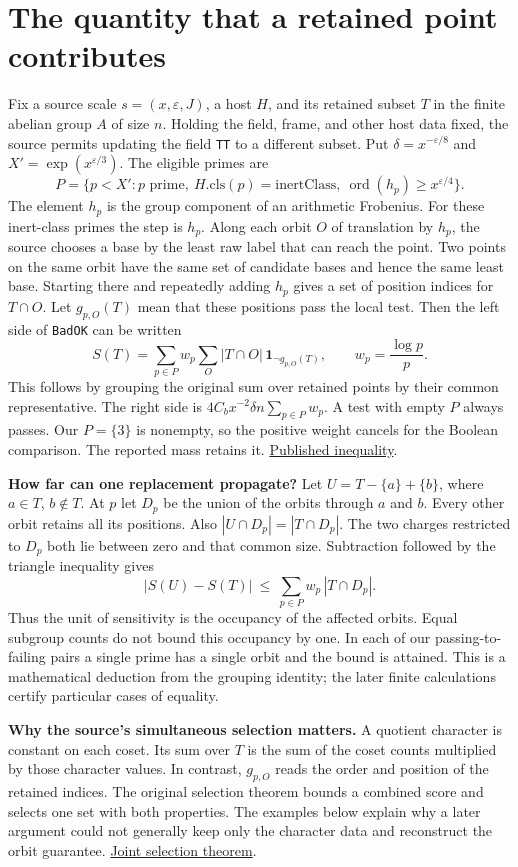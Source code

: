 \documentclass[11pt,letterpaper]{article}
\newcommand{\orig}[3]{\href{https://github.com/nousentllc/riemann-hypothesis/blob/40e56bab026552e089d7afcfeff08d2defb9c005/src/#1.lean\#L#2}{#3}}
\newcommand{\pp}[1]{\par\medskip\noindent\textbf{#1}\enspace}
\newcommand{\nextsection}[1]{\clearpage\section{#1}}
\begin{document}
\nextsection{The quantity that a retained point contributes}
Fix a source scale \(s=(x,\varepsilon,J)\), a host \(H\), and its retained subset \(T\) in the finite abelian group \(A\) of size \(n\). Holding the field, frame, and other host data fixed, the source permits updating the field \texttt{TT} to a different subset. Put \(\delta=x^{-\varepsilon/8}\) and \(X'=\exp(x^{\varepsilon/3})\). The eligible primes are
\[
 P=\{p<X':p\text{ prime},\ H.\mathrm{cls}(p)=\mathrm{inertClass},\
                      \operatorname{ord}(h_p)\ge x^{\varepsilon/4}\}.
\]
The element \(h_p\) is the group component of an arithmetic Frobenius. For these inert-class primes the step is \(h_p\). Along each orbit \(O\) of translation by \(h_p\), the source chooses a base by the least raw label that can reach the point. Two points on the same orbit have the same set of candidate bases and hence the same least base. Starting there and repeatedly adding \(h_p\) gives a set of position indices for \(T\cap O\). Let \(g_{p,O}(T)\) mean that these positions pass the local test. Then the left side of \texttt{BadOK} can be written
\[
 S(T)=\sum_{p\in P}w_p\sum_O |T\cap O|\,\mathbf 1_{\neg g_{p,O}(T)},
 \qquad w_p=\frac{\log p}{p}.
\]
This follows by grouping the original sum over retained points by their common representative. The right side is \(4 C_b x^{-2}\delta n\sum_{p\in P}w_p\). A test with empty \(P\) always passes. Our \(P=\{3\}\) is nonempty, so the positive weight cancels for the Boolean comparison. The reported mass retains it. \orig{Development/AbelianVarietyTheory/Definitions/GlobalTwisting/ThinScalesIffHostBound}{35}{Published inequality}.

\pp{How far can one replacement propagate?} Let \(U=T-\{a\}+\{b\}\), where \(a\in T\), \(b\notin T\). At \(p\) let \(D_p\) be the union of the orbits through \(a\) and \(b\). Every other orbit retains all its positions. Also \(|U\cap D_p|=|T\cap D_p|\). The two charges restricted to \(D_p\) both lie between zero and that common size. Subtraction followed by the triangle inequality gives
\[
 |S(U)-S(T)|\ \le\ \sum_{p\in P}w_p\,|T\cap D_p|.
\]
Thus the unit of sensitivity is the occupancy of the affected orbits. Equal subgroup counts do not bound this occupancy by one. In each of our passing-to-failing pairs a single prime has a single orbit and the bound is attained. This is a mathematical deduction from the grouping identity; the later finite calculations certify particular cases of equality.

\pp{Why the source's simultaneous selection matters.} A quotient character is constant on each coset. Its sum over \(T\) is the sum of the coset counts multiplied by those character values. In contrast, \(g_{p,O}\) reads the order and position of the retained indices. The original selection theorem bounds a combined score and selects one set with both properties. The examples below explain why a later argument could not generally keep only the character data and reconstruct the orbit guarantee. \orig{Development/AutomorphicArithmetic/ThickFrames/topsChoiceH}{29}{Joint selection theorem}.
\end{document}
